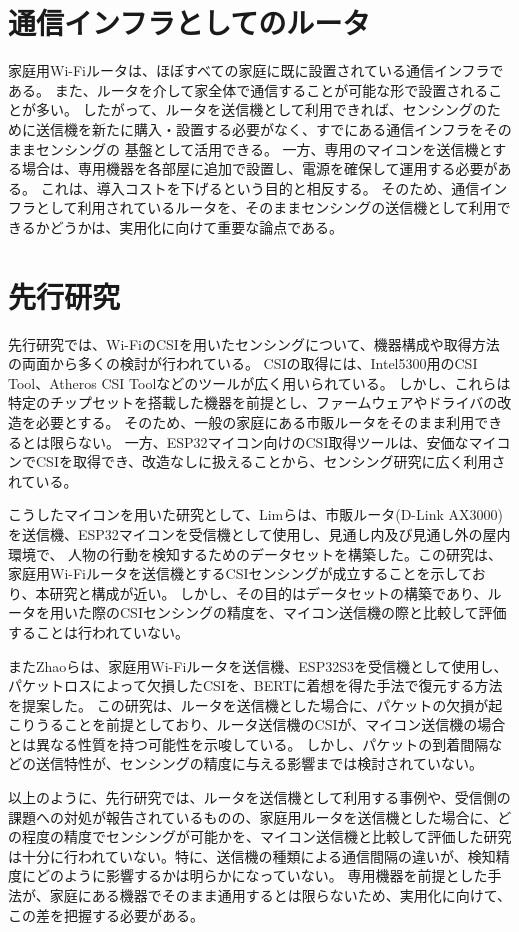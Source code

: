 \documentclass[uplatex, 12pt]{ujbook}
\begin{document}
\section{通信インフラとしてのルータ}
家庭用Wi-Fiルータは、ほぼすべての家庭に既に設置されている通信インフラである。
また、ルータを介して家全体で通信することが可能な形で設置されることが多い。
したがって、ルータを送信機として利用できれば、センシングのために送信機を新たに購入・設置する必要がなく、すでにある通信インフラをそのままセンシングの
基盤として活用できる。
一方、専用のマイコンを送信機とする場合は、専用機器を各部屋に追加で設置し、電源を確保して運用する必要がある。
これは、導入コストを下げるという目的と相反する。
そのため、通信インフラとして利用されているルータを、そのままセンシングの送信機として利用できるかどうかは、実用化に向けて重要な論点である。
\section{先行研究}
先行研究では、Wi-FiのCSIを用いたセンシングについて、機器構成や取得方法の両面から多くの検討が行われている。
CSIの取得には、Intel5300用のCSI Tool、Atheros CSI Toolなどのツールが広く用いられている。
しかし、これらは特定のチップセットを搭載した機器を前提とし、ファームウェアやドライバの改造を必要とする。
そのため、一般の家庭にある市販ルータをそのまま利用できるとは限らない。
一方、ESP32マイコン向けのCSI取得ツールは、安価なマイコンでCSIを取得でき、改造なしに扱えることから、センシング研究に広く利用されている。


こうしたマイコンを用いた研究として、Limらは、市販ルータ(D-Link AX3000)を送信機、ESP32マイコンを受信機として使用し、見通し内及び見通し外の屋内環境で、
人物の行動を検知するためのデータセットを構築した。この研究は、家庭用Wi-Fiルータを送信機とするCSIセンシングが成立することを示しており、本研究と構成が近い。
しかし、その目的はデータセットの構築であり、ルータを用いた際のCSIセンシングの精度を、マイコン送信機の際と比較して評価することは行われていない。\cite{lim}


またZhaoらは、家庭用Wi-Fiルータを送信機、ESP32S3を受信機として使用し、パケットロスによって欠損したCSIを、BERTに着想を得た手法で復元する方法を提案した。
この研究は、ルータを送信機とした場合に、パケットの欠損が起こりうることを前提としており、ルータ送信機のCSIが、マイコン送信機の場合とは異なる性質を持つ可能性を示唆している。
しかし、パケットの到着間隔などの送信特性が、センシングの精度に与える影響までは検討されていない。\cite{zhao}

以上のように、先行研究では、ルータを送信機として利用する事例や、受信側の課題への対処が報告されているものの、家庭用ルータを送信機とした場合に、どの程度の精度でセンシングが可能かを、マイコン送信機と比較して評価した研究は十分に行われていない。特に、送信機の種類による通信間隔の違いが、検知精度にどのように影響するかは明らかになっていない。
専用機器を前提とした手法が、家庭にある機器でそのまま通用するとは限らないため、実用化に向けて、この差を把握する必要がある。
\end{document}
